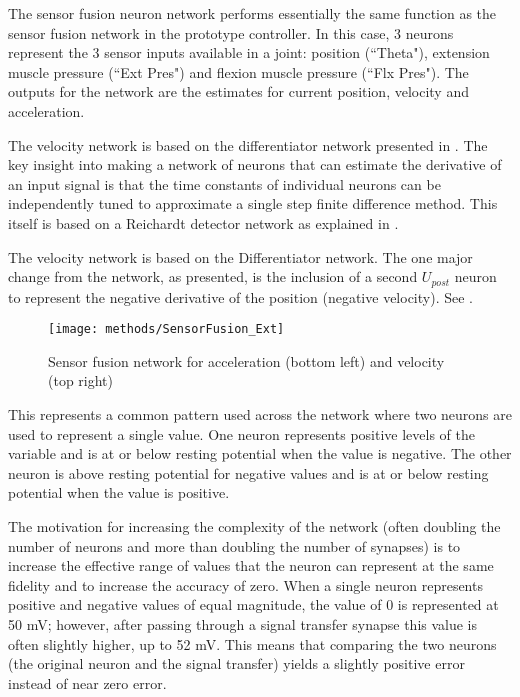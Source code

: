 
The sensor fusion neuron network performs essentially the same function as the
sensor fusion network in the prototype controller. In this case, 3 neurons
represent the 3 sensor inputs available in a joint: position (``Theta"),
extension muscle pressure (``Ext Pres") and flexion muscle pressure
(``Flx Pres"). The outputs for the network are the estimates for current 
position, velocity and acceleration.



The velocity network is based on the differentiator network presented in 
\cite{NickFunctionalSubnetwork}. The key insight into making a network
of neurons that can estimate the derivative of an input signal is that
the time constants of individual neurons can be independently tuned to 
approximate a single step finite difference method. This itself is based
on a Reichardt detector network as explained in
\cite{NickFunctionalSubnetwork}.


The velocity network is based on the Differentiator network. 
The one major change from the network,
as presented, is the inclusion of a second $U_{post}$ neuron to 
represent the negative derivative of the position (negative velocity). See .

\begin{figure}
\centering
\texttt{[image: methods/SensorFusion\_Ext]}
\caption{Sensor fusion network for acceleration (bottom left) and velocity (top right)}
\label{fig:SensorFusion}
\end{figure}

This represents
a common pattern used across the network where two neurons are used to represent
a single value. One neuron represents positive levels of the variable and is 
at or below resting potential when the value is negative. The other neuron is
above resting potential for negative values and is at or below resting potential
when the value is positive. 

The motivation for increasing the complexity of the
network (often doubling the number of neurons and more than doubling the number of synapses) is to increase the
effective range of values that the neuron can represent at the same fidelity and
to increase the accuracy of zero. When a single neuron represents positive and
negative values of equal magnitude, the value of 0 is represented at 50 mV; 
however, after passing through a signal transfer synapse this value is often
slightly higher, up to 52 mV. This means that comparing the two neurons (the
original neuron and the signal transfer) yields a slightly positive error
instead of near zero error.

